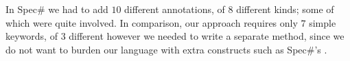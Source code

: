 In Spec\# we had to add $10$ different annotations, of $8$ different kinds; some of which were quite involved. In comparison, our approach requires only $7$ simple keywords, of $3$ different  however we needed to write 
a separate \Q@moveTo@ method, since we do not want to burden our language with extra constructs such as Spec\#'s \Q@expose@.

%

